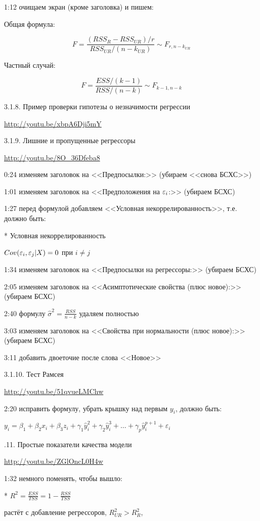 \documentclass[12pt,a4paper]{article}
\begin{document}
1:12 очищаем экран (кроме заголовка) и пишем:

Общая формула:

\[
F=\frac{(RSS_R-RSS_{UR})/r}{RSS_{UR}/(n-k_{UR})} \sim F_{r,n-k_{UR}}
\]

Частный случай:

\[
F=\frac{ESS/(k-1)}{RSS/(n-k)} \sim F_{k-1,n-k}
\]



3.1.8. Пример проверки гипотезы о незначимости регрессии

\url{http://youtu.be/xbpA6Dji5mY}


3.1.9. Лишние и пропущенные регрессоры

\url{http://youtu.be/8O_36Dfeba8}

0:24 изменяем заголовок на <<Предпосылки:>> (убираем <<снова БСХС>>)

1:01 изменяем заголовок на <<Предположения на $\varepsilon_i$:>> (убираем БСХС)

1:27 перед формулой добавляем <<Условная некоррелированность>>, т.е. должно быть:

* Условная некоррелированность

$Cov(\varepsilon_i, \varepsilon_j | X)=0$ при $i \neq j$

1:34 изменяем заголовок на <<Предпосылки на регрессоры:>> (убираем БСХС)

2:05 изменяем заголовок на <<Асимптотические свойства (плюс новое):>> (убираем БСХС)

2:40 формулу $\hat{\sigma}^2=\frac{RSS}{n-k}$ удаляем полностью

3:03 изменяем заголовок на <<Свойства при нормальности (плюс новое):>> (убираем БСХС)

3:11 добавить двоеточие после слова <<Новое>>

3.1.10. Тест Рамсея

\url{http://youtu.be/51qvueLMChw}

2:20 исправить формулу, убрать крышку над первым $y_i$, должно быть:

$y_i = \beta_1 + \beta_2 x_i + \beta_3 z_i + \gamma_1 \hat{y}^2_i + \gamma_2 \hat{y}^3_i + \ldots + \gamma_p \hat{y}_i^{p+1} + \varepsilon_i$

.11. Простые показатели качества модели

\url{http://youtu.be/ZGlOncL0H4w}

1:32 немного поменять, чтобы вышло:

* $R^2=\frac{ESS}{TSS}=1-\frac{RSS}{TSS}$ 

растёт с добавление регрессоров, $R^2_{UR}>R^2_R$, 
\end{document}

